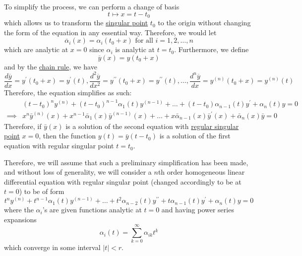 \documentclass{article}
\begin{document}
      To simplify the process, we can perform a change of basis 
      \begin{equation}
        t \mapsto x = t - t_0
      \end{equation}
      which allows us to transform the \hyperref[def:singular-point]{singular point} $t_0$ to the origin without changing the form of the equation in any essential way. Therefore, we would let 
      \begin{equation}
        \overline{\alpha}_i (x) = \alpha_i (t_0 + x) \text{ for all } i = 1, 2, \ldots, n
      \end{equation}
      which are analytic at $x = 0$ since $\alpha_i$ is analytic at $t = t_0$. Furthermore, we define
      \begin{equation}
        \overline{y}(x) = y (t_0 + x)
      \end{equation}
      and by the \hyperref[mv-thm:chain-rule]{chain rule}, we have
      \begin{equation}
        \frac{d \overline{y}}{dx} = y^\prime (t_0 + x) = y^\prime (t), \frac{d^2 \overline{y}}{dx^2} = y^{\prime\prime} (t_0 + x) = y^{\prime\prime} (t), \ldots, \frac{d^n \overline{y}}{dx} = y^{(n)} (t_0 + x) = y^{(n)} (t)
      \end{equation}
      Therefore, the equation simplifies as such: 
      \begin{align}
          & (t - t_0)^n y^{(n)} + (t - t_0)^{n-1} \alpha_1 (t) y^{(n-1)} + \ldots + (t - t_0) \alpha_{n-1} (t) y^\prime + \alpha_n (t) y = 0 \\
          \implies & x^n \bar{y}^{(n)}(x) + x^{n-1} \bar{\alpha}_1(x) \bar{y}^{(n-1)} (x) + \ldots + x \bar{\alpha}_{n-1} (x) \bar{y}^\prime (x) + \bar{\alpha}_n (x) \bar{y} = 0
      \end{align}
      Therefore, if $\bar{y}(x)$ is a solution of the second equation with \hyperref[def:regular-singular-point]{regular singular point} $x = 0$, then the function $y(t) = \bar{y} (t - t_0)$ is a solution of the first equation with regular singular point $t = t_0$. 

      Therefore, we will assume that such a preliminary simplification has been made, and without loss of generality, we will consider a $n$th order homogeneous linear differential equation with regular singular point (changed accordingly to be at $t = 0$) to be of form
      \begin{equation}
        t^n y^{(n)} + t^{n-1} \alpha_1 (t) y^{(n-1)} + \ldots + t^2 \alpha_{n-2} (t) y^{\prime\prime} + t \alpha_{n-1} (t) y^\prime + \alpha_n (t) y = 0
      \end{equation}
      where the $\alpha_i$'s are given functions analytic at $t = 0$ and having power series expansions 
      \begin{equation}
        \alpha_i (t) = \sum_{k=0}^\infty \alpha_{ik} t^k
      \end{equation}
      which converge in some interval $|t|<r$. 
\end{document}
